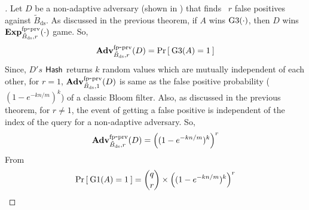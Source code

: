 \begin{proof}[]
Let $D$ be a non-adaptive adversary (shown in ) that finds ~$r$ false positives against $\tilde{B}_{\mathrm{ds}}$. As discussed in the previous theorem, if $A$ wins $\text{G3}(\cdot)$, then $D$ wins $\mathrm{\mathbf{Exp}}^{\mathrm{fp\mbox{-}prv}}_{\tilde{B}_{\mathrm{ds}},r}(\cdot)$ game. So, 
\begin{equation}
\mathrm{\mathbf{Adv}}^{\mathrm{fp\mbox{-}prv}}_{\tilde{B}_{\mathrm{ds}},r}(D) = \Pr\left[\: \text{G3}(A) = 1 \:\right]\label{eq:2T8}
\end{equation}
Since, $D's$ $\mathsf{Hash}$ returns $k$ random values which are mutually independent of each other, for $r=1$, $\mathrm{\mathbf{Adv}}^{\mathrm{fp\mbox{-}prv}}_{\tilde{B}_{\mathrm{ds}},1}(D)$ is same as the false positive probability ($(1-e^{-kn/m})^k$) of a classic Bloom filter. Also, as discussed in the previous theorem, for $r \neq 1$, the event of getting a false positive is independent of the index of the query for a non-adaptive adversary. So,
\begin{equation}
\mathrm{\mathbf{Adv}}^{\mathrm{fp\mbox{-}prv}}_{\tilde{B}_{\mathrm{ds}},r}(D) =   \left( (1-e^{-kn/m})^k  \right)^r \label{eq:2T8a}
\end{equation}
\noindent
From 
\begin{equation}
\Pr\left[\: \text{G1}(A)=1 \:\right] = \dbinom{q}{r} \times \left( (1-e^{-kn/m})^k  \right)^r \label{eq:2T8b}
\end{equation}


\end{proof}
